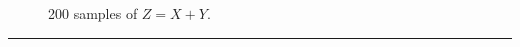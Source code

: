 \documentclass[12pt, letterpaper]{scrartcl}
\begin{document}
\begin{enumerate}[((a))]
        \begin{figure}[h!]
            \centering
            \caption{200 samples of $Z=X+Y$.}
        \end{figure}
    \end{enumerate}
\hrule
\clearpage
\end{document}
